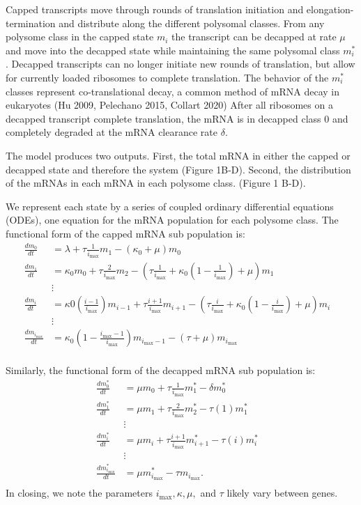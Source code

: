 \documentclass[review]{elsarticle}
\newcommand{\imax}{\ensuremath{{i_{\max}}}\xspace}
\begin{document}
Capped transcripts move through rounds of translation initiation and elongation-termination and distribute along the different polysomal classes. 
From any polysome class in the capped state $m_i$ the transcript can be decapped at rate $\mu$  and move into the decapped state while maintaining the same polysomal class $m_i^*$.
Decapped transcripts can no longer initiate new rounds of translation, but allow for currently loaded ribosomes to complete translation. 
The behavior of the $m_i^*$ classes represent co-translational decay, a common method of mRNA decay in eukaryotes (Hu 2009, Pelechano 2015, Collart 2020) 
After all ribosomes on a decapped transcript complete translation, the mRNA is in decapped class 0 and completely degraded at the mRNA clearance rate $\delta$.

The model produces two outputs. 
First, the total mRNA in either the capped or decapped state and therefore the system (Figure 1B-D). 
Second, the distribution of the mRNAs in each mRNA in each polysome class. (Figure 1 B-D).

We represent each state by a series of coupled ordinary differential equations (ODEs), one equation for the mRNA population for each polysome class. 
The functional form of the capped mRNA sub population is:
\begin{align} \label{eq:Capped_ODE}
\frac{dm_{0}}{dt} &= \lambda+ \tau \frac{1}{\imax}m_{1}-\left(\kappa_0 + \mu\right)m_{0} \\ \nonumber
\frac{dm_{1}}{dt} &= \kappa_0 m_{0}+ \tau \frac{2}{\imax}m_{2}-\left( \tau \frac{1}{\imax}+\kappa_0\left(1-\frac{1}{\imax}\right)+\mu\right) m_{1}\\ \nonumber
& \vdots & \\ \nonumber
\frac{dm_{i}}{dt} &= \kappa0 \left(\frac{i-1}{\imax}\right) m_{i-1}+ \tau \frac{i+1}{\imax}m_{i+1}-\left( \tau \frac{i}{\imax}+\kappa_0\left(1-\frac{i}{\imax}\right)+\mu\right) m_{i} \\ \nonumber
& \vdots & \\ \nonumber
\frac{dm_{\imax}}{dt} &= \kappa_0\left(1-\frac{\imax-1}{\imax}\right)m_{\imax-1}-\left( \tau +\mu\right) m_{\imax}\\ \nonumber
\end{align}

Similarly, the functional form of the decapped mRNA sub population is: 
\begin{align}\label{eq:Decapped_ODE}
\frac{dm_{0}^{*}}{dt} &= \mu m_{0}+ \tau \frac{1}{\imax}m_{1}^{*}-\delta m_{0}^{*} \\ \nonumber
\frac{dm_{1}^{*}}{dt} &= \mu m_{1}+ \tau \frac{2}{\imax}m_{2}^{*}-\tau(1)m_{1}^{*} \\ \nonumber
& \vdots & \\ \nonumber
\frac{dm_{i}^{*}}{dt} &= \mu m_{i}+ \tau \frac{i+1}{\imax}m_{i+1}^{*}-\tau(i)m_{i}^{*} \\ \nonumber
& \vdots & \\ \nonumber
\frac{dm_{\imax}^{*}}{dt} &= \mu m_{\imax}^{*}- \tau m_{\imax}. \\ \nonumber
\end{align}
In closing, we note the parameters $\imax, \kappa, \mu,$ and $\tau$ likely vary between genes.
\end{document}
